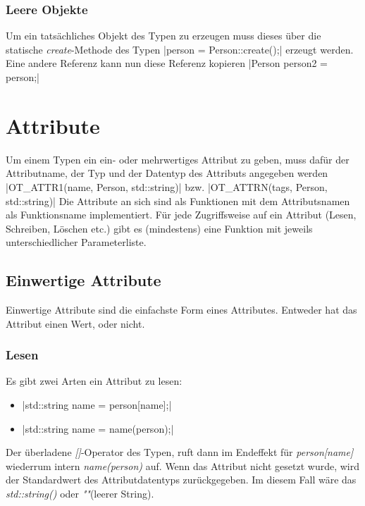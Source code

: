 \documentclass[oneside]{ausarbeitung}
\begin{document}
\subsection{Leere Objekte}
\label{sub:objects_empty}
Um ein tatsächliches Objekt des Typen zu erzeugen muss dieses über die statische \textit{create}-Methode des Typen
|person = Person::create();| 
erzeugt werden. Eine andere Referenz kann nun diese Referenz kopieren
|Person person2 = person;| 

\chapter{Attribute}
\label{cha:attributes}
Um einem Typen ein ein- oder mehrwertiges Attribut zu geben, muss dafür der Attributname, der Typ und der Datentyp des Attributs angegeben werden
|OT_ATTR1(name, Person, std::string)|
bzw.
|OT_ATTRN(tags, Person, std::string)|
Die Attribute an sich sind als Funktionen mit dem Attributsnamen als Funktionsname implementiert. Für jede Zugriffsweise auf ein Attribut (Lesen, Schreiben, Löschen etc.) gibt es (mindestens) eine Funktion mit jeweils unterschiedlicher Parameterliste.

\section{Einwertige Attribute}
\label{sec:attributes_1}
Einwertige Attribute sind die einfachste Form eines Attributes. Entweder hat das Attribut einen Wert, oder nicht.

\subsection{Lesen}
\label{sub:attributes_1_read}
Es gibt zwei Arten ein Attribut zu lesen:
\begin{itemize}
\item {}|std::string name = person[name];|
\item {}|std::string name = name(person);|
\end{itemize}
Der überladene \textit{[]}-Operator des Typen, ruft dann im Endeffekt für \textit{person[name]} wiederrum intern \textit{name(person)} auf. Wenn das Attribut nicht gesetzt wurde, wird der Standardwert des Attributdatentyps zurückgegeben. Im diesem Fall wäre das \textit{std::string()} oder \textit{"{}"{}}(leerer String).
\end{document}
